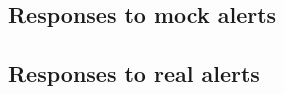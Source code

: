 \subsection{Responses to mock alerts}\label{subsec:RealResponseMockAlert}

\subsection{Responses to real alerts}\label{subsec:RealResponseRealAlert}